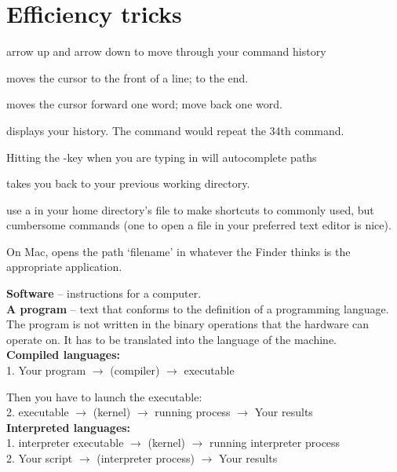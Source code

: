 \documentclass[landscape]{foils}
\begin{document}
\myNewSlide
\textwidth 8in
\oddsidemargin -0.0in

\section*{Efficiency tricks}
\normalsize
\begin{compactenum}
	\item arrow up and arrow down to move through your command history
	\item {} moves the cursor to the front of a line;  to the end.
	\item {} moves the cursor forward one word;  move back one word.
	\item {} displays your history. The command  would repeat the 34th command.
	\item Hitting the -key when you are typing in  will autocomplete paths
	\item {} takes you back to your previous working directory.
	\item use a  in your home directory's  file to make shortcuts to commonly used, but cumbersome commands (one to open a file in your preferred text editor is nice).
	\item On Mac,  opens the path `filename' in whatever the Finder thinks is the appropriate application.
\end{compactenum}


\myNewSlide
\large
{\bf Software} -- instructions for a computer.\\
{\bf A program} -- text that conforms to the definition of a programming language. The program is not written in the binary operations that the hardware can operate on.  It has to be translated into the language of the machine.\\
{\bf Compiled languages:}\\
1. {\color{red} Your program} $\rightarrow$ (compiler) $\rightarrow$ executable\par
Then you have to launch the executable:\\
2. executable $\rightarrow$ (kernel) $\rightarrow$ running process $\rightarrow$ {\color{red} Your results}\\
{\bf Interpreted languages:}\\
1. interpreter executable $\rightarrow$ (kernel) $\rightarrow$ running interpreter process\\
2. {\color{red} Your script}  $\rightarrow$ (interpreter process) $\rightarrow$ {\color{red} Your results}
\end{document}
